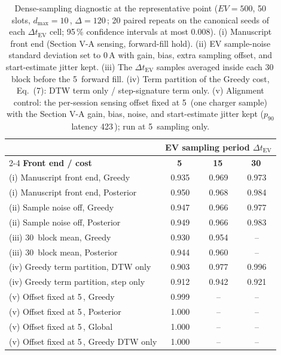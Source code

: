 \documentclass[10pt]{article}
\newcommand{\sq}{\,\text{s}}
\begin{document}
\begin{table}[h]
\centering
\caption{Dense-sampling diagnostic at the representative point ($EV = 500$, 50 slots, $d_{\max} = 10$\sq, $\Delta = 120$\sq; 20 paired repeats on the canonical seeds of each $\Delta t_{\text{EV}}$ cell; 95\,\% confidence intervals at most 0.008). (i) Manuscript front end (Section V-A sensing, forward-fill hold). (ii) EV sample-noise standard deviation set to 0\,A with gain, bias, extra sampling offset, and start-estimate jitter kept. (iii) The $\Delta t_{\text{EV}}$ samples averaged inside each 30\sq{} block before the 5\sq{} forward fill. (iv) Term partition of the Greedy cost, Eq.~(7): DTW term only / step-signature term only. (v) Alignment control: the per-session sensing offset fixed at 5\sq{} (one charger sample) with the Section V-A gain, bias, noise, and start-estimate jitter kept ($p_{90}$ latency 423\sq); run at 5\sq{} sampling only.}
\label{tab:sampling}
\small
\begin{tabular}{@{}lccc@{}}
\toprule
& \multicolumn{3}{c}{\textbf{EV sampling period} $\Delta t_{\text{EV}}$} \\
\cmidrule(lr){2-4}
\textbf{Front end / cost} & \textbf{5\sq} & \textbf{15\sq} & \textbf{30\sq} \\
\midrule
(i) Manuscript front end, Greedy & 0.935 & 0.969 & 0.973 \\
(i) Manuscript front end, Posterior & 0.950 & 0.968 & 0.984 \\
(ii) Sample noise off, Greedy & 0.947 & 0.966 & 0.977 \\
(ii) Sample noise off, Posterior & 0.949 & 0.966 & 0.983 \\
(iii) 30\sq{} block mean, Greedy & 0.930 & 0.954 & -- \\
(iii) 30\sq{} block mean, Posterior & 0.944 & 0.960 & -- \\
(iv) Greedy term partition, DTW only & 0.903 & 0.977 & 0.996 \\
(iv) Greedy term partition, step only & 0.912 & 0.942 & 0.921 \\
(v) Offset fixed at 5\sq, Greedy & 0.999 & -- & -- \\
(v) Offset fixed at 5\sq, Posterior & 1.000 & -- & -- \\
(v) Offset fixed at 5\sq, Global & 1.000 & -- & -- \\
(v) Offset fixed at 5\sq, Greedy DTW only & 1.000 & -- & -- \\
\bottomrule
\end{tabular}
\end{table}
\end{document}
